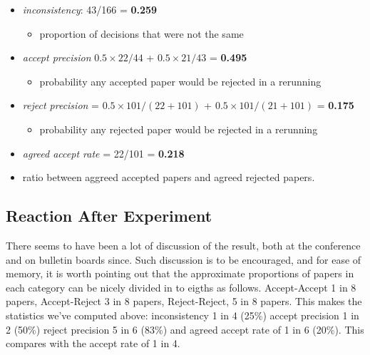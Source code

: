 \begin{itemize}
\tightlist
\item
  \emph{inconsistency}: 43/166 = \textbf{0.259}

  \begin{itemize}
  \tightlist
  \item
    proportion of decisions that were not the same
  \end{itemize}
\item
  \emph{accept precision} \(0.5 \times 22/44\) + \(0.5 \times 21/43\) =
  \textbf{0.495}

  \begin{itemize}
  \tightlist
  \item
    probability any accepted paper would be rejected in a rerunning
  \end{itemize}
\item
  \emph{reject precision} = \(0.5\times 101/(22+101)\) +
  \(0.5\times 101/(21 + 101)\) = \textbf{0.175}

  \begin{itemize}
  \tightlist
  \item
    probability any rejected paper would be rejected in a rerunning
  \end{itemize}
\item
  \emph{agreed accept rate} = 22/101 = \textbf{0.218}
\item
  ratio between aggreed accepted papers and agreed rejected papers.
\end{itemize}

\hypertarget{reaction-after-experiment}{%
\subsection{Reaction After Experiment}\label{reaction-after-experiment}}

\begin{flushright}
\end{flushright}

There seems to have been a lot of discussion of the result, both at the
conference and on bulletin boards since. Such discussion is to be
encouraged, and for ease of memory, it is worth pointing out that the
approximate proportions of papers in each category can be nicely divided
in to eigths as follows. Accept-Accept 1 in 8 papers, Accept-Reject 3 in
8 papers, Reject-Reject, 5 in 8 papers. This makes the statistics we've
computed above: inconsistency 1 in 4 (25\%) accept precision 1 in 2
(50\%) reject precision 5 in 6 (83\%) and agreed accept rate of 1 in 6
(20\%). This compares with the accept rate of 1 in 4.

